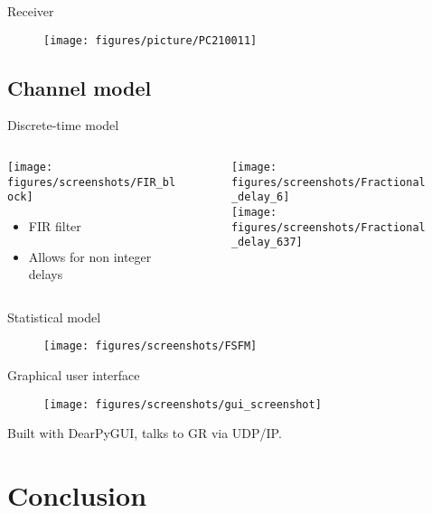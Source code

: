 \documentclass[xetex, onlymath, handout]{beamer}
\begin{document}
\begin{frame}{Receiver}
  \begin{figure}
    \centering
    \texttt{[image: figures/picture/PC210011]}
  \end{figure}
\end{frame}

\subsection{Channel model}

\begin{frame}{Discrete-time model}
\begin{columns}
	\begin{column}{.4\linewidth}
		\texttt{[image: figures/screenshots/FIR\_block]}
		\vspace{1cm}
		\begin{itemize}
			\item FIR filter
			\item Allows for non integer delays
		\end{itemize}
	\end{column}
	\begin{column}{.6\linewidth}
		\begin{figure}
			\centering
			\texttt{[image: figures/screenshots/Fractional\_delay\_6]}\\
			\texttt{[image: figures/screenshots/Fractional\_delay\_637]}
		\end{figure}
	\end{column}
\end{columns}
\end{frame}

\begin{frame}{Statistical model}
	\begin{figure}
		\centering
		\texttt{[image: figures/screenshots/FSFM]}
	\end{figure}
\end{frame}

\begin{frame}{Graphical user interface}
  \begin{figure}
    \centering
    \texttt{[image: figures/screenshots/gui\_screenshot]}
  \end{figure}
  Built with DearPyGUI, talks to GR via UDP/IP.
\end{frame}

\section{Conclusion}
\end{document}
